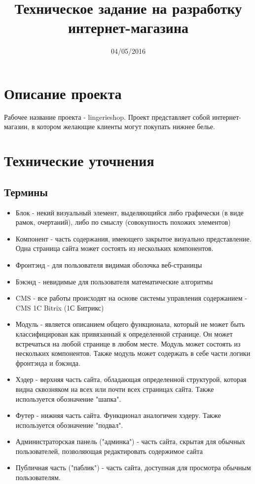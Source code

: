 \documentclass[DIV=calc, paper=a4, fontsize=11pt]{scrartcl} %
\title{Техническое задание на разработку интернет-магазина}
\date{04/05/2016}
\begin{document}
\maketitle

\section{Описание проекта}
Рабочее название проекта - lingerieshop. Проект представляет собой интернет-магазин, в котором желающие клиенты могут покупать нижнее белье.


\section{Технические уточнения}

\subsection{Термины}

        \begin{itemize}
        \item Блок - некий визуальный элемент, выделяющийся либо графически (в виде рамок, очертаний), либо по смыслу (совокупность похожих элементов)
        \item Компонент - часть содержания, имеющего закрытое визуально представление. Одна страница сайта может состоять из нескольких компонентов.
        \item Фронтэнд - для пользователя видимая оболочка веб-страницы
        \item Бэкэнд - невидимые для пользователя математические алгоритмы
        \item CMS - все работы происходят на основе системы управления содержанием - CMS 1C Bitrix (1С Битрикс)
        \item Модуль - является описанием общего функционала, который не может быть классифицирован как привязанный к определенной странице. Он может встречаться на любой странице в любом месте. Модуль может состоять из нескольких компонентов. Также модуль может содержать в себе части логики фронтэнда и бэкэнда.
        \item Хэдер - верхняя часть сайта, обладающая определенной структурой, которая видна сквозняком на всех или почти всех страницах сайта. Также используется обозначение "шапка".
        \item Футер - нижняя часть сайта. Функционал аналогичен хэдеру. Также используется обозначение "подвал".
        \item Администраторская панель ("админка") - часть сайта, скрытая для обычных пользователей, позволяющая редактировать содержимое сайта
        \item Публичная часть ("паблик") - часть сайта, доступная для просмотра обычным пользователям.

    \end{itemize}
    
\end{document}
